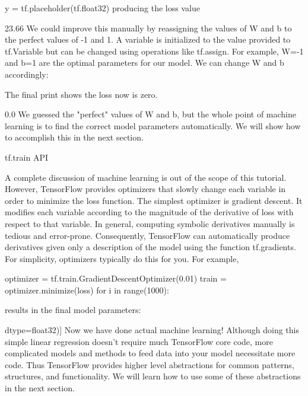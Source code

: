 y = tf.placeholder(tf.float32)
producing the loss value

23.66
We could improve this manually by reassigning the values of W and b to the perfect values of -1 and 1. A variable is initialized to the value provided to tf.Variable but can be changed using operations like tf.assign. For example, W=-1 and b=1 are the optimal parameters for our model. We can change W and b accordingly:

The final print shows the loss now is zero.

0.0
We guessed the "perfect" values of W and b, but the whole point of machine learning is to find the correct model parameters automatically. We will show how to accomplish this in the next section.

tf.train API

A complete discussion of machine learning is out of the scope of this tutorial. However, TensorFlow provides optimizers that slowly change each variable in order to minimize the loss function. The simplest optimizer is gradient descent. It modifies each variable according to the magnitude of the derivative of loss with respect to that variable. In general, computing symbolic derivatives manually is tedious and error-prone. Consequently, TensorFlow can automatically produce derivatives given only a description of the model using the function tf.gradients. For simplicity, optimizers typically do this for you. For example,

optimizer = tf.train.GradientDescentOptimizer(0.01)
train = optimizer.minimize(loss)
for i in range(1000):

results in the final model parameters:

 dtype=float32)]
Now we have done actual machine learning! Although doing this simple linear regression doesn't require much TensorFlow core code, more complicated models and methods to feed data into your model necessitate more code. Thus TensorFlow provides higher level abstractions for common patterns, structures, and functionality. We will learn how to use some of these abstractions in the next section.


